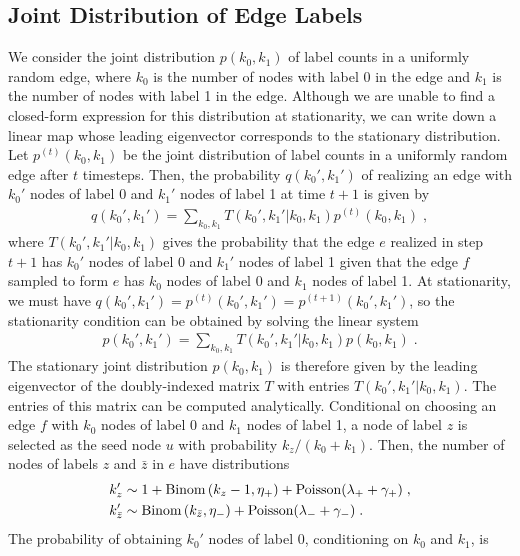 \documentclass[aps,pre,reprint,superscriptaddress,nofootinbib]{revtex4-2}
\begin{document}
\subsection{Joint Distribution of Edge Labels}



We consider the joint distribution $p(k_0, k_1)$ of label counts in a uniformly random edge, where $k_0$ is the number of nodes with label 0 in the edge and $k_1$ is the number of nodes with label 1 in the edge. 
Although we are unable to find a closed-form expression for this distribution at stationarity, we can write down a linear map whose leading eigenvector corresponds to the stationary distribution.
Let $p^{(t)}(k_0, k_1)$ be the joint distribution of label counts in a uniformly random edge after $t$ timesteps. 
Then, the probability $q(k_0', k_1')$ of realizing an edge with $k_0'$ nodes of label 0 and $k_1'$ nodes of label 1 at time $t+1$ is given by 
\begin{align}
    q(k_0', k_1') = \sum_{k_0, k_1} T(k_0', k_1' | k_0, k_1)p^{(t)}(k_0, k_1)  \;,
\end{align}
where $T(k_0', k_1' | k_0, k_1)$ gives the probability that the edge $e$ realized in step $t+1$ has $k_0'$ nodes of label 0 and $k_1'$ nodes of label 1 given that the edge $f$ sampled to form $e$ has $k_0$ nodes of label 0 and $k_1$ nodes of label 1.
At stationarity, we must have $q(k_0', k_1') = p^{(t)}(k_0', k_1') = p^{(t+1)}(k_0', k_1')$, so the stationarity condition can be obtained by solving the linear system 
\begin{align}
    p(k_0', k_1') = \sum_{k_0, k_1} T(k_0', k_1' | k_0, k_1)p(k_0, k_1)  \;.
\end{align}
The stationary joint distribution $p(k_0, k_1)$ is therefore given by the leading eigenvector of the doubly-indexed matrix $T$ with entries $T(k_0', k_1' | k_0, k_1)$.
The entries of this matrix can be computed analytically. 
Conditional on choosing an edge $f$ with $k_0$ nodes of label 0 and $k_1$ nodes of label 1, a node of label $z$ is selected as the seed node $u$ with probability $k_z / (k_0 + k_1)$.
Then, the number of nodes of labels $z$ and $\bar{z}$ in $e$ have distributions
\begin{align*}
    k_z' &\sim 1 + \text{Binom}\left( k_z - 1, \eta_+ \right) + \text{Poisson}(\lambda_+ + \gamma_+) \;, \\
    k_{\bar{z}}' &\sim \text{Binom}\left( k_{\bar{z}}, \eta_- \right) + \text{Poisson}(\lambda_- + \gamma_-) \;.
\end{align*}
The probability of obtaining $k_0'$ nodes of label 0, conditioning on $k_0$ and $k_1$, is 
\end{document}
